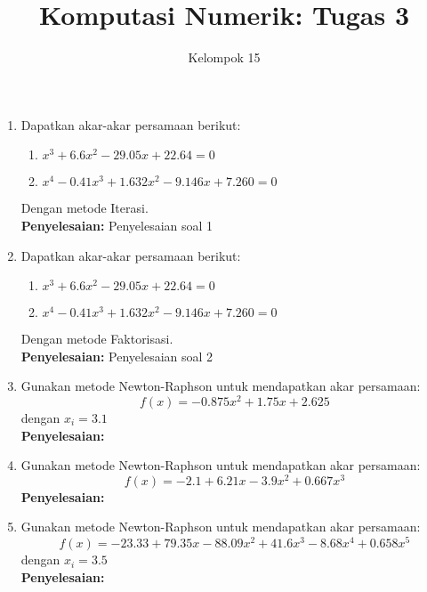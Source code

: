 \documentclass{article}
\title{\textbf{Komputasi Numerik: Tugas 3}}
\author{Kelompok 15}
\date{}
\newcommand{\penyelesaian}{\textbf{Penyelesaian: }}
\begin{document}
\maketitle

\begin{enumerate}
    \item Dapatkan akar-akar persamaan berikut: 
    \begin{enumerate}
        \item $x^3 + \num{6,6}x^2 - \num{29,05}x + \num{22,64} = 0$
        \item $x^4 - \num{0,41}x^3 + \num{1,632}x^2 - \num{9,146}x + \num{7,260} = 0$
    \end{enumerate}
    Dengan metode Iterasi. \\
    \penyelesaian Penyelesaian soal 1

    \item Dapatkan akar-akar persamaan berikut: 
    \begin{enumerate}
        \item $x^3 + \num{6,6}x^2 - \num{29,05}x + \num{22,64} = 0$
        \item $x^4 - \num{0,41}x^3 + \num{1,632}x^2 - \num{9,146}x + \num{7,260} = 0$
    \end{enumerate}
    Dengan metode Faktorisasi. \\
    \penyelesaian Penyelesaian soal 2

    \item Gunakan metode Newton-Raphson untuk mendapatkan akar persamaan: \\
    \begin{equation*}
        f(x) = -\num{0,875}x^2 + \num{1,75}x + \num{2,625}
    \end{equation*}
    dengan $x_i = \num{3,1}$ \\
    \penyelesaian

    \item Gunakan metode Newton-Raphson untuk mendapatkan akar persamaan: \\
    \begin{equation*}
        f(x) = -\num{2,1} + \num{6,21}x - \num{3,9}x^2 + \num{0,667}x^3
    \end{equation*}
    \penyelesaian

    \item Gunakan metode Newton-Raphson untuk mendapatkan akar persamaan: \\
    \begin{equation*}
        f(x) = -\num{23,33} + \num{79,35}x - \num{88,09}x^2 + \num{41,6}x^3 - \num{8,68}x^4 + \num{0,658}x^5
    \end{equation*}
    dengan $x_i = \num{3,5}$ \\
    \penyelesaian


\end{enumerate}
\end{document}
